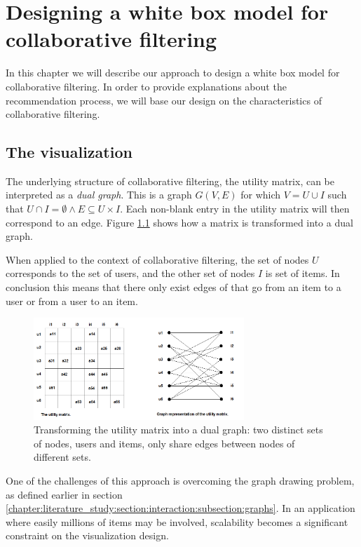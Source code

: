 \chapter{Designing a white box model for collaborative filtering}\label{chapter:whitebox}

In this chapter we will describe our approach to design a white box model for collaborative filtering. In order to provide explanations about the recommendation process, we will base our design on the characteristics of collaborative filtering.

\section{The visualization}\label{chapter:whitebox:section:visualization}

The underlying structure of collaborative filtering, the utility matrix, can be interpreted as a \emph{dual graph}. This is a graph $G(V,E)$ for which $V = U \cup I$ such that $U \cap I = \emptyset \wedge E \subseteq U \times I$\cite{dekimpe:2007}. Each non-blank entry in the utility matrix will then correspond to an edge. Figure \ref{figure:dualgraph} shows how a matrix is transformed into a dual graph.

When applied to the context of collaborative filtering, the set of nodes $U$ corresponds to the set of users, and the other set of nodes $I$ is set of items. In conclusion this means that there only exist edges of that go from an item to a user or from a user to an item.

\begin{figure}%
	\begin{center}
		\includegraphics[width=300px]{img/dualgraph}
	\end{center}
	\caption{Transforming the utility matrix into a dual graph: two distinct sets of nodes, users and items, only share edges between nodes of different sets.}%
	\label{figure:dualgraph}%
\end{figure}

One of the challenges of this approach is overcoming the graph drawing problem, as defined earlier in section \ref{chapter:literature_study:section:interaction:subsection:graphs}. In an application where easily millions of items may be involved, scalability becomes a significant constraint on the visualization design\cite{herman:2000}.

